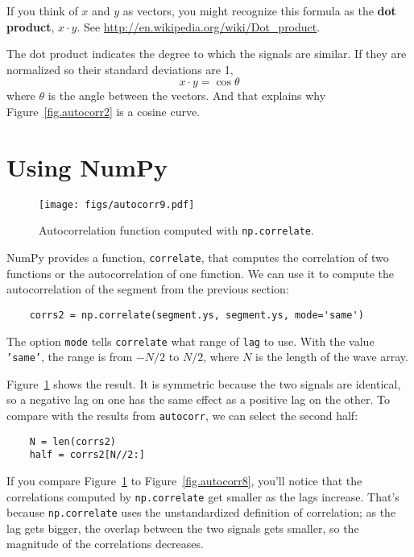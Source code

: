 If you think of $x$ and $y$ as vectors, you might recognize this
formula as the {\bf dot product}, $x \cdot y$.  See
\url{http://en.wikipedia.org/wiki/Dot_product}.

\newcommand{\norm}{\mathrm{norm}}

The dot product indicates the degree to which the signals are similar.
If they are normalized so their standard deviations are 1,
%
\[ x \cdot y = \cos \theta \]
%
where $\theta$ is the angle between the vectors.  And that explains
why Figure~\ref{fig.autocorr2} is a cosine curve.


\section{Using NumPy}
\label{correlate}

\begin{figure}
	\centerline{\texttt{[image: figs/autocorr9.pdf]}}
	\caption{Autocorrelation function computed with {\tt np.correlate}.}
	\label{fig.autocorr9}
\end{figure}

NumPy provides a function, {\tt correlate}, that computes
the correlation of two functions or the autocorrelation of one
function.  We can use it to compute the autocorrelation of
the segment from the previous section:

\begin{verbatim}
	corrs2 = np.correlate(segment.ys, segment.ys, mode='same')
\end{verbatim}

The option {\tt mode} tells {\tt correlate} what range
of {\tt lag} to use.  With the value {\tt 'same'}, the
range is from $-N/2$ to $N/2$, where $N$ is the length of the
wave array.

Figure~\ref{fig.autocorr9} shows the result.  It is symmetric because
the two signals are identical, so a negative lag on one has the same
effect as a positive lag on the other.  To compare with the results
from {\tt autocorr}, we can select the second half:

\begin{verbatim}
	N = len(corrs2)
	half = corrs2[N//2:]
\end{verbatim}

If you compare Figure~\ref{fig.autocorr9} to Figure~\ref{fig.autocorr8},
you'll notice that the correlations computed by {\tt np.correlate}
get smaller as the lags increase.  That's because {\tt np.correlate}
uses the unstandardized definition of correlation;
as the lag gets bigger, the
overlap between the two signals gets smaller, so the magnitude of
the correlations decreases.

